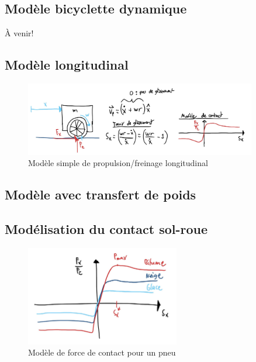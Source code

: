\subsection{Modèle bicyclette dynamique}

À venir!


\subsection{Modèle longitudinal}

\begin{figure}[htbp]
	\centering
		\includegraphics[width=0.90\textwidth]{fig/longitudinalmodel.jpg}
	\caption{Modèle simple de propulsion/freinage longitudinal}
	\label{fig:longitudinalmodel}
\end{figure}


\subsection{Modèle avec transfert de poids}


\subsection{Modélisation du contact sol-roue}

\begin{figure}[htbp]
	\centering
		\includegraphics[width=0.60\textwidth]{fig/slipcurve.jpg}
	\caption{Modèle de force de contact pour un pneu}
	\label{fig:slipcurve}
\end{figure}






